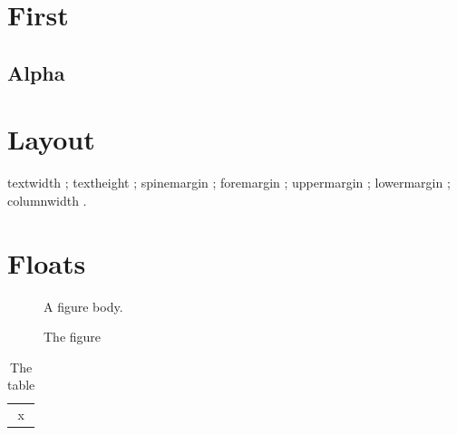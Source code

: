 \documentclass[11pt,oneside]{memoir}
\begin{document}
\chapter{First}
\section{Alpha}
\chapter{Layout}
textwidth \the\textwidth; textheight \the\textheight; spinemargin \the\spinemargin; foremargin \the\foremargin;
uppermargin \the\uppermargin; lowermargin \the\lowermargin; columnwidth \the\columnwidth.
\listoffigures
\listoftables*
\chapter{Floats}
\begin{figure}\centering A figure body.\caption{The figure}\end{figure}
\begin{table}\centering\begin{tabular}{c}x\end{tabular}\caption{The table}\end{table}
\end{document}
